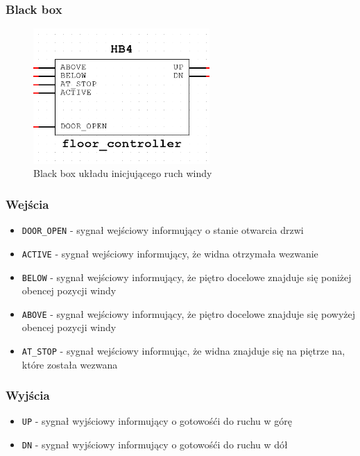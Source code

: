 \documentclass[a4paper]{article}
\begin{document}
\subsubsection{Black box}
\begin{figure}[H]
    \centering
    \includegraphics[width=0.6\textwidth]{floor_controller.png}
    \caption{Black box układu inicjującego ruch windy}
\end{figure}

\subsubsection{Wejścia}
\begin{itemize}
    \item \verb|DOOR_OPEN| - sygnał wejściowy informujący o stanie otwarcia drzwi
    \item \verb|ACTIVE| - sygnał wejściowy informujący, że widna otrzymała wezwanie
    \item \verb|BELOW| - sygnał wejściowy informujący, że piętro docelowe znajduje się poniżej obencej pozycji windy
    \item \verb|ABOVE| - sygnał wejściowy informujący, że piętro docelowe znajduje się powyżej obencej pozycji windy
    \item \verb|AT_STOP| - sygnał wejściowy informując, że widna znajduje się na piętrze na, które została wezwana
\end{itemize}

\subsubsection{Wyjścia}
\begin{itemize}
    \item \verb|UP| - sygnał wyjściowy informujący o gotowośći do ruchu w górę
    \item \verb|DN| - sygnał wyjściowy informujący o gotowośći do ruchu w dół
\end{itemize}
\end{document}
